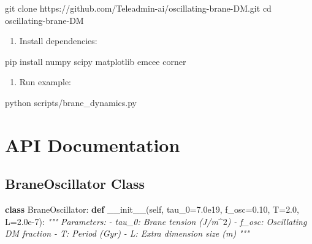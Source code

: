 \documentclass[
  11pt,
]{report}
\newenvironment{Shaded}{}{}
\newcommand{\BuiltInTok}[1]{\textcolor[rgb]{0.00,0.50,0.00}{#1}}
\newcommand{\CommentTok}[1]{\textcolor[rgb]{0.38,0.63,0.69}{\textit{#1}}}
\newcommand{\ExtensionTok}[1]{#1}
\newcommand{\FloatTok}[1]{\textcolor[rgb]{0.25,0.63,0.44}{#1}}
\newcommand{\FunctionTok}[1]{\textcolor[rgb]{0.02,0.16,0.49}{#1}}
\newcommand{\KeywordTok}[1]{\textcolor[rgb]{0.00,0.44,0.13}{\textbf{#1}}}
\newcommand{\NormalTok}[1]{#1}
\newcommand{\OperatorTok}[1]{\textcolor[rgb]{0.40,0.40,0.40}{#1}}
\newcommand{\VariableTok}[1]{\textcolor[rgb]{0.10,0.09,0.49}{#1}}
\providecommand{\tightlist}{%
  \setlength{\itemsep}{0pt}\setlength{\parskip}{0pt}}
\begin{document}
\begin{Shaded}
\begin{Highlighting}[]
\FunctionTok{git}\NormalTok{ clone https://github.com/Teleadmin{-}ai/oscillating{-}brane{-}DM.git}
\BuiltInTok{cd}\NormalTok{ oscillating{-}brane{-}DM}
\end{Highlighting}
\end{Shaded}

\begin{enumerate}
\def\labelenumi{\arabic{enumi}.}
\setcounter{enumi}{1}
\tightlist
\item
  Install dependencies:
\end{enumerate}

\begin{Shaded}
\begin{Highlighting}[]
\ExtensionTok{pip}\NormalTok{ install numpy scipy matplotlib emcee corner}
\end{Highlighting}
\end{Shaded}

\begin{enumerate}
\def\labelenumi{\arabic{enumi}.}
\setcounter{enumi}{2}
\tightlist
\item
  Run example:
\end{enumerate}

\begin{Shaded}
\begin{Highlighting}[]
\ExtensionTok{python}\NormalTok{ scripts/brane\_dynamics.py}
\end{Highlighting}
\end{Shaded}

\section{API Documentation}\label{api-documentation}

\subsection{BraneOscillator Class}\label{braneoscillator-class}

\begin{Shaded}
\begin{Highlighting}[]
\KeywordTok{class}\NormalTok{ BraneOscillator:}
    \KeywordTok{def} \FunctionTok{\_\_init\_\_}\NormalTok{(}\VariableTok{self}\NormalTok{, tau\_0}\OperatorTok{=}\FloatTok{7.0e19}\NormalTok{, f\_osc}\OperatorTok{=}\FloatTok{0.10}\NormalTok{, T}\OperatorTok{=}\FloatTok{2.0}\NormalTok{, L}\OperatorTok{=}\FloatTok{2.0e{-}7}\NormalTok{):}
        \CommentTok{"""}
\CommentTok{        Parameters:}
\CommentTok{        {-} tau\_0: Brane tension (J/m$\^{}2$)}
\CommentTok{        {-} f\_osc: Oscillating DM fraction}
\CommentTok{        {-} T: Period (Gyr)}
\CommentTok{        {-} L: Extra dimension size (m)}
\CommentTok{        """}
\end{Highlighting}
\end{Shaded}
\end{document}
